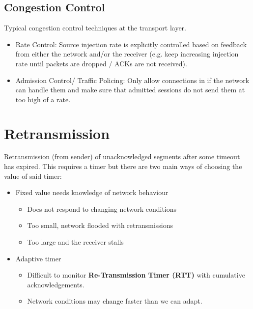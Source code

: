 \documentclass[11pt]{article}
\begin{document}
\subsection{Congestion Control}
\label{sec:org8dade4a}
Typical congestion control techniques at the transport layer.
\begin{itemize}
\item Rate Control: Source injection rate is explicitly controlled based on feedback from either the network and/or the receiver (e.g. keep increasing injection rate until packets are dropped / ACKs are not received).
\item Admission Control/ Traffic Policing: Only allow connections in if the network can handle them and make sure that admitted sessions do not send them at too high of a rate.
\end{itemize}

\section{Retransmission}
\label{sec:orgeb37643}
Retransmission (from sender) of unacknowledged segments after some timeout has expired.
This requires a timer but there are two main ways of choosing the value of said timer:
\begin{itemize}
\item Fixed value needs knowledge of network behaviour
\begin{itemize}
\item Does not respond to changing network conditions
\item Too small, network flooded with retransmissions
\item Too large and the receiver stalls
\end{itemize}
\item Adaptive timer
\begin{itemize}
\item Difficult to monitor \textbf{Re-Transmission Timer (RTT)} with cumulative acknowledgements.
\item Network conditions may change faster than we can adapt.
\end{itemize}
\end{itemize}
\end{document}
